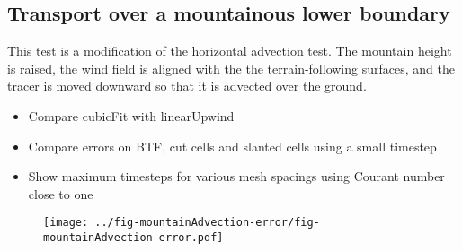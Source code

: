 \subsection{Transport over a mountainous lower boundary}
This test is a modification of the \citet{schaer2002} horizontal advection test.  The mountain height is raised, the wind field is aligned with the the terrain-following surfaces, and the tracer is moved downward so that it is advected over the ground.

\begin{itemize}
	\item Compare cubicFit with linearUpwind
	\item Compare errors on BTF, cut cells and slanted cells using a small timestep
	\item Show maximum timesteps for various mesh spacings using Courant number close to one
\end{itemize}

\begin{figure}
	\centering
	\texttt{[image: ../fig-mountainAdvection-error/fig-mountainAdvection-error.pdf]}
	\caption{}
\end{figure}

\begin{figure}
	\centering
	\caption{}
\end{figure}

